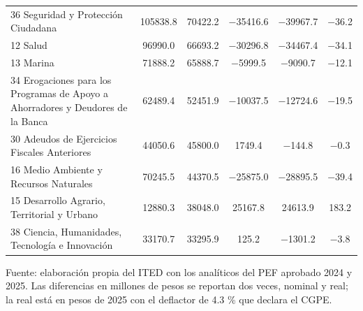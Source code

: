 \begin{table}[htbp]
\begin{tabular}{L{4.2cm}SSSSS}
{36 Seguridad y Protección Ciudadana} & \num{105838.8} & \num{70422.2} & \num{-35416.6} & \num{-39967.7} & \num{-36.2} \\
{12 Salud} & \num{96990.0} & \num{66693.2} & \num{-30296.8} & \num{-34467.4} & \num{-34.1} \\
{13 Marina} & \num{71888.2} & \num{65888.7} & \num{-5999.5} & \num{-9090.7} & \num{-12.1} \\
{34 Erogaciones para los Programas de Apoyo a Ahorradores y Deudores de la Banca} & \num{62489.4} & \num{52451.9} & \num{-10037.5} & \num{-12724.6} & \num{-19.5} \\
{30 Adeudos de Ejercicios Fiscales Anteriores} & \num{44050.6} & \num{45800.0} & \num{1749.4} & \num{-144.8} & \num{-0.3} \\
{16 Medio Ambiente y Recursos Naturales} & \num{70245.5} & \num{44370.5} & \num{-25875.0} & \num{-28895.5} & \num{-39.4} \\
{15 Desarrollo Agrario, Territorial y Urbano} & \num{12880.3} & \num{38048.0} & \num{25167.8} & \num{24613.9} & \num{183.2} \\
{38 Ciencia, Humanidades, Tecnología e Innovación} & \num{33170.7} & \num{33295.9} & \num{125.2} & \num{-1301.2} & \num{-3.8} \\
\bottomrule
\end{tabular}
\par\vspace{2pt}\footnotesize Fuente: elaboración propia del ITED con los analíticos del PEF aprobado 2024 y 2025. Las diferencias en millones de pesos se reportan dos veces, nominal y real; la real está en pesos de 2025 con el deflactor de 4.3 \% que declara el CGPE.
\end{table}
